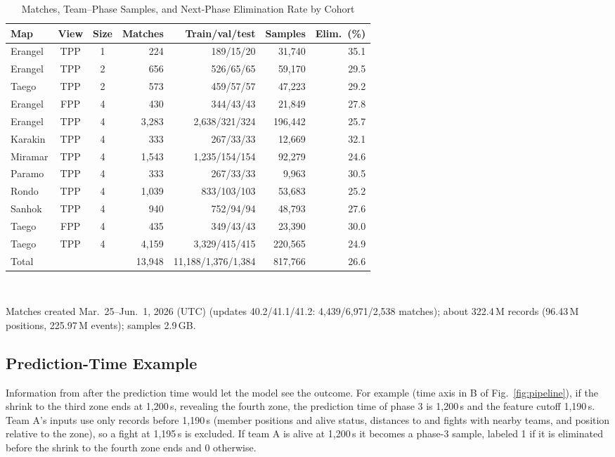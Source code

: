 \documentclass[sigconf,anonymous,nonacm]{acmart}
\begin{document}
\begin{table}[t]
\centering
\caption{Matches, Team--Phase Samples, and Next-Phase Elimination Rate by Cohort}
\label{tab:cohorts}
\footnotesize
\setlength{\tabcolsep}{2.7pt}
\begin{tabular}{lccrrrr}
\hline
Map & View & Size & Matches & Train/val/test & Samples & Elim.\ (\%) \\
\hline
Erangel & TPP & 1 & 224 & 189/15/20 & 31,740 & 35.1 \\
Erangel & TPP & 2 & 656 & 526/65/65 & 59,170 & 29.5 \\
Taego & TPP & 2 & 573 & 459/57/57 & 47,223 & 29.2 \\
Erangel & FPP & 4 & 430 & 344/43/43 & 21,849 & 27.8 \\
Erangel & TPP & 4 & 3,283 & 2,638/321/324 & 196,442 & 25.7 \\
Karakin & TPP & 4 & 333 & 267/33/33 & 12,669 & 32.1 \\
Miramar & TPP & 4 & 1,543 & 1,235/154/154 & 92,279 & 24.6 \\
Paramo & TPP & 4 & 333 & 267/33/33 & 9,963 & 30.5 \\
Rondo & TPP & 4 & 1,039 & 833/103/103 & 53,683 & 25.2 \\
Sanhok & TPP & 4 & 940 & 752/94/94 & 48,793 & 27.6 \\
Taego & FPP & 4 & 435 & 349/43/43 & 23,390 & 30.0 \\
Taego & TPP & 4 & 4,159 & 3,329/415/415 & 220,565 & 24.9 \\
\hline
Total & & & 13,948 & 11,188/1,376/1,384 & 817,766 & 26.6 \\
\hline
\end{tabular}
\\[2pt]
\parbox{\columnwidth}{\scriptsize Matches created Mar.~25--Jun.~1, 2026 (UTC) (updates 40.2/41.1/41.2: 4,439/6,971/2,538 matches); about 322.4\,M records (96.43\,M positions, 225.97\,M events); samples 2.9\,GB.}
\end{table}

\subsection{Prediction-Time Example}
\label{sec:method:samples}
Information from after the prediction time would let the model see the outcome.
For example (time axis in B of Fig.~\ref{fig:pipeline}), if the shrink to the third zone ends at 1,200\,s, revealing the fourth zone, the prediction time of phase 3 is 1,200\,s and the feature cutoff 1,190\,s.
Team A's inputs use only records before 1,190\,s (member positions and alive status, distances to and fights with nearby teams, and position relative to the zone), so a fight at 1,195\,s is excluded.
If team A is alive at 1,200\,s it becomes a phase-3 sample, labeled 1 if it is eliminated before the shrink to the fourth zone ends and 0 otherwise.
\end{document}
